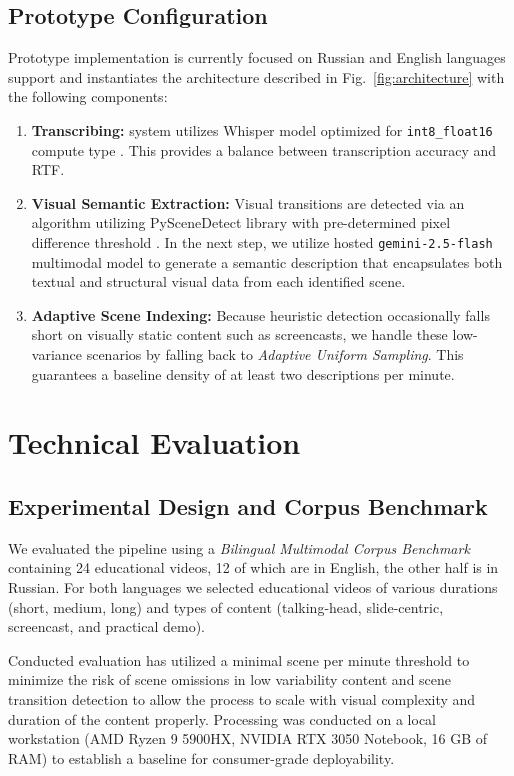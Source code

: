 ﻿\documentclass[conference]{IEEEtran}
\begin{document}
\subsection{Prototype Configuration}
Prototype implementation is currently focused on Russian and English languages support and instantiates the architecture described in Fig.~\ref{fig:architecture} with the following components:
\begin{enumerate}
\item \textbf{Transcribing:} system utilizes Whisper model optimized for \texttt{int8\_float16} compute type \cite{Radford2022}. This provides a balance between transcription accuracy and RTF.
\item \textbf{Visual Semantic Extraction:} Visual transitions are detected via an algorithm utilizing PySceneDetect library with pre-determined pixel difference threshold \cite{PySceneDetect}. In the next step, we utilize hosted \texttt{gemini-2.5-flash} multimodal model \cite{GeminiTeam2025} to generate a semantic description that encapsulates both textual and structural visual data from each identified scene.
\item \textbf{Adaptive Scene Indexing:} Because heuristic detection occasionally falls short on visually static content such as screencasts, we handle these low-variance scenarios by falling back to \emph{Adaptive Uniform Sampling}. This guarantees a baseline density of at least two descriptions per minute.
\end{enumerate}

\section{Technical Evaluation}
\subsection{Experimental Design and Corpus Benchmark}
We evaluated the pipeline using a  \emph{Bilingual Multimodal Corpus Benchmark} containing 24 educational videos, 12 of which are in English, the other half is in Russian. For both languages we selected educational videos of various durations (short, medium, long) and types of content (talking-head, slide-centric, screencast, and practical demo).

Conducted evaluation has utilized a minimal scene per minute threshold to minimize the risk of scene omissions in low variability content and scene transition detection to allow the process to scale with visual complexity and duration of the content properly. Processing was conducted on a local workstation (AMD Ryzen 9 5900HX,
NVIDIA RTX 3050 Notebook, 16 GB of RAM) to establish a baseline for consumer-grade deployability.
\end{document}
